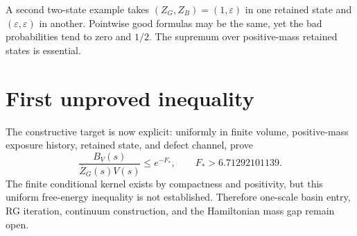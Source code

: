\documentclass[11pt]{article}
\begin{document}
A second two-state example takes
$(Z_G,Z_B)=(1,\varepsilon)$ in one retained state and
$(\varepsilon,\varepsilon)$ in another.  Pointwise good formulas may be the
same, yet the bad probabilities tend to zero and $1/2$.  The supremum over
positive-mass retained states is essential.

\section{First unproved inequality}
The constructive target is now explicit: uniformly in finite volume,
positive-mass exposure history, retained state, and defect channel, prove
\[
 \frac{B_V(s)}{\overline Z_G(s)V(s)}\le e^{-F_*},
 \qquad F_*>6.71292101139.
\]
The finite conditional kernel exists by compactness and positivity, but this
uniform free-energy inequality is not established.  Therefore one-scale
basin entry, RG iteration, continuum construction, and the Hamiltonian mass
gap remain open.
\end{document}
